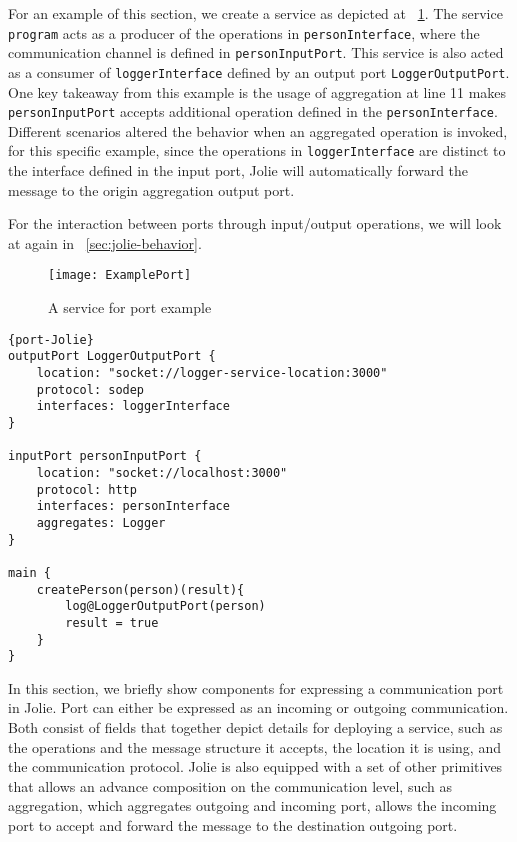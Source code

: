 \FloatBarrier

For an example of this section, we create a service as depicted at ~\ref{list:example-port-graphic}.
The service \texttt{program} acts as a producer of the operations in \texttt{personInterface}, where the communication channel is defined in \texttt{personInputPort}.
This service is also acted as a consumer of \texttt{loggerInterface} defined by an output port \texttt{LoggerOutputPort}.
One key takeaway from this example is the usage of aggregation at line 11 makes \texttt{personInputPort} accepts additional operation defined in the \texttt{personInterface}. Different scenarios altered the behavior when an aggregated operation is invoked, for this specific example, since the operations in \texttt{loggerInterface} are distinct to the interface defined in the input port, Jolie will automatically forward the message to the origin aggregation output port.

For the interaction between ports through input/output operations, we will look at again in ~\ref{sec:jolie-behavior}.

\begin{figure}[ht]
    \texttt{[image: ExamplePort]}
    \centering
    \caption{A service for port example}
    \label{list:example-port-graphic}
\end{figure}

\begin{listing}[ht]

    \lstset{language=Jolie,
        style=codeStyle,
        numbers=left,
        firstnumber=1
    }
    \begin{lstlisting}[frame=tlrb, caption= {Jolie Port declaration example}, label={list:example-port} ]{port-Jolie}
outputPort LoggerOutputPort {
    location: "socket://logger-service-location:3000"
    protocol: sodep
    interfaces: loggerInterface
}

inputPort personInputPort {
    location: "socket://localhost:3000"
    protocol: http
    interfaces: personInterface
    aggregates: Logger
}

main {
    createPerson(person)(result){
        log@LoggerOutputPort(person)
        result = true
    }
}
\end{lstlisting}
\end{listing}

In this section, we briefly show components for expressing a communication port in Jolie. Port can either be expressed as an incoming or outgoing communication. Both consist of fields that together depict details for deploying a service, such as the operations and the message structure it accepts, the location it is using, and the communication protocol. Jolie is also equipped with a set of other primitives that allows an advance composition on the communication level, such as aggregation, which aggregates outgoing and incoming port, allows the incoming port to accept and forward the message to the destination outgoing port.

\FloatBarrier
